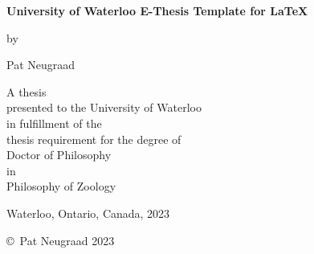 \pagestyle{empty}

\begin{titlepage}
        \begin{center}
        \vspace*{1.0cm}

        \Huge
        {\bf University of Waterloo E-Thesis Template for \LaTeX }

        \vspace*{1.0cm}

        \normalsize
        by \\

        \vspace*{1.0cm}

        \Large
        Pat Neugraad \\

        \vspace*{3.0cm}

        \normalsize
        A thesis \\
        presented to the University of Waterloo \\ 
        in fulfillment of the \\
        thesis requirement for the degree of \\
        Doctor of Philosophy \\
        in \\
        Philosophy of Zoology \\

        \vspace*{2.0cm}

        Waterloo, Ontario, Canada, 2023 \\

        \vspace*{1.0cm}

        \copyright\ Pat Neugraad 2023 \\
        \end{center}
\end{titlepage}

\pagestyle{plain}
\setcounter{page}{2}

